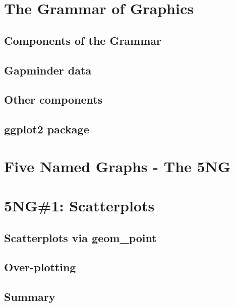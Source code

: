\documentclass[
  12pt, krantz2,
]{krantz}
\begin{document}
\hypertarget{grammarofgraphics}{%
\section{The Grammar of Graphics}\label{grammarofgraphics}}

\hypertarget{components-of-the-grammar}{%
\subsection{Components of the Grammar}\label{components-of-the-grammar}}

\hypertarget{gapminder}{%
\subsection{Gapminder data}\label{gapminder}}

\hypertarget{other-components}{%
\subsection{Other components}\label{other-components}}

\hypertarget{ggplot2-package}{%
\subsection{ggplot2 package}\label{ggplot2-package}}

\hypertarget{FiveNG}{%
\section{Five Named Graphs - The 5NG}\label{FiveNG}}

\hypertarget{scatterplots}{%
\section{5NG\#1: Scatterplots}\label{scatterplots}}

\hypertarget{geompoint}{%
\subsection{Scatterplots via geom\_point}\label{geompoint}}

\hypertarget{overplotting}{%
\subsection{Over-plotting}\label{overplotting}}

\hypertarget{summary}{%
\subsection{Summary}\label{summary}}
\end{document}
